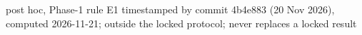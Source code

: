 post hoc, Phase-1 rule E1 timestamped by commit 4b4e883 (20 Nov 2026), computed 2026-11-21; outside the locked protocol; never replaces a locked result

